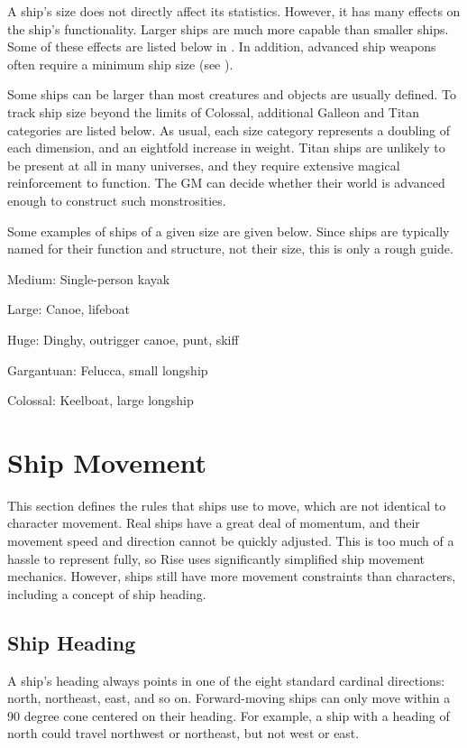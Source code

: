  A ship's size does not directly affect its statistics.
  However, it has many effects on the ship's functionality.
  Larger ships are much more capable than smaller ships.
  Some of these effects are listed below in .
  In addition, advanced ship weapons often require a minimum ship size (see ).

  Some ships can be larger than most creatures and objects are usually defined.
  To track ship size beyond the limits of Colossal, additional Galleon and Titan categories are listed below.
  As usual, each size category represents a doubling of each dimension, and an eightfold increase in weight.
  Titan ships are unlikely to be present at all in many universes, and they require extensive magical reinforcement to function.
  The GM can decide whether their world is advanced enough to construct such monstrosities.

  Some examples of ships of a given size are given below.
  Since ships are typically named for their function and structure, not their size, this is only a rough guide.
  \begin{raggeditemize}
    \item Medium: Single-person kayak
    \item Large: Canoe, lifeboat
    \item Huge: Dinghy, outrigger canoe, punt, skiff
    \item Gargantuan: Felucca, small longship
    \item Colossal: Keelboat, large longship
  \end{raggeditemize}

\section{Ship Movement}
  This section defines the rules that ships use to move, which are not identical to character movement.
  Real ships have a great deal of momentum, and their movement speed and direction cannot be quickly adjusted.
  This is too much of a hassle to represent fully, so Rise uses significantly simplified ship movement mechanics.
  However, ships still have more movement constraints than characters, including a concept of ship heading.

  \subsection{Ship Heading}
    A ship's heading always points in one of the eight standard cardinal directions: north, northeast, east, and so on.
    Forward-moving ships can only move within a 90 degree cone centered on their heading.
    For example, a ship with a heading of north could travel northwest or northeast, but not west or east.

